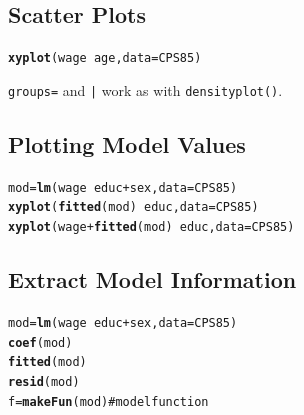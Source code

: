 \documentclass{report}\usepackage{graphicx, color}
\makeatletter
\newcommand{\hlfunctioncall}[1]{\textcolor[rgb]{0.501960784313725,0,0.329411764705882}{\textbf{#1}}}%
\newcommand{\hlcomment}[1]{\textcolor[rgb]{0.180392156862745,0.6,0.341176470588235}{#1}}%
\newenvironment{kframe}{%
 \def\at@end@of@kframe{}%
 \ifinner\ifhmode%
  \def\at@end@of@kframe{\end{minipage}}%
  \begin{minipage}{\columnwidth}%
 \fi\fi%
 \def\FrameCommand##1{\hskip\@totalleftmargin \hskip-\fboxsep
 \colorbox{shadecolor}{##1}\hskip-\fboxsep
     \hskip-\linewidth \hskip-\@totalleftmargin \hskip\columnwidth}%
 \MakeFramed {\advance\hsize-\width
   \@totalleftmargin\z@ \linewidth\hsize
   \@setminipage}}%
 {\par\unskip\endMakeFramed%
 \at@end@of@kframe}
\newenvironment{knitrout}{}{} %
\makeatother
\begin{document}
\begin{multicols}{4}
\vspace*{-.2in}

\subsection*{Scatter Plots}

\vspace*{-.1in}
\begin{knitrout}
\color{fgcolor}\begin{kframe}
\begin{alltt}
\hlfunctioncall{xyplot}(wage ~ age, data = CPS85)
\end{alltt}
\end{kframe}
\end{knitrout}

\texttt{groups=} and \texttt{|} work as with \texttt{densityplot()}.

\subsection*{Plotting Model Values}

\vspace*{-.1in}

\begin{knitrout}
\color{fgcolor}\begin{kframe}
\begin{alltt}
mod = \hlfunctioncall{lm}(wage ~ educ+sex,data=CPS85 )
\hlfunctioncall{xyplot}(\hlfunctioncall{fitted}(mod) ~ educ,data=CPS85 )
\hlfunctioncall{xyplot}(wage+\hlfunctioncall{fitted}(mod) ~ educ,data=CPS85)
\end{alltt}
\end{kframe}
\end{knitrout}


\vspace*{-.2in}

\subsection*{Extract Model Information}

\vspace*{-.1in}

\begin{knitrout}
\color{fgcolor}\begin{kframe}
\begin{alltt}
mod = \hlfunctioncall{lm}(wage ~ educ + sex, data = CPS85)
\hlfunctioncall{coef}(mod)
\hlfunctioncall{fitted}(mod)
\hlfunctioncall{resid}(mod)
f = \hlfunctioncall{makeFun}(mod)  \hlcomment{# model function}
\end{alltt}
\end{kframe}
\end{knitrout}


\end{multicols}
\end{document}
